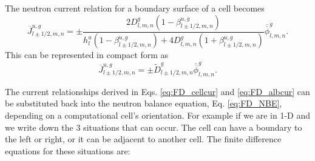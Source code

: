 \documentclass{ansconf}
\numberwithin{equation}{section}
\begin{document}
The neutron current relation for a boundary surface of a cell becomes
\begin{equation}
    \overline{J}^{u,g}_{l\pm1/2,m,n} = \pm \frac{2D_{l,m,n}^{g} \left(1-\beta_{l\pm1/2,m,n}^{u,g}\right)}{h_{l}^{u} \left(1-\beta_{l\pm1/2,m,n}^{u,g}\right) + 4D_{l,m,n}^{g} \left(1+\beta_{l\pm1/2,m,n}^{u,g}\right)}
    \overline{\overline{\phi}}_{l,m,n}^{g}.
\end{equation}
This can be represented in compact form as
\begin{equation}\label{eq:FD_albcur}
       \overline{J}^{u,g}_{l\pm1/2,m,n} = \pm \widetilde{D}_{l\pm1/2,m,n}^{g}
    \overline{\overline{\phi}}_{l,m,n}^{g}. 
\end{equation}

The current relationships derived in Eqs. \eqref{eq:FD_cellcur} and \eqref{eq:FD_albcur} can be substituted back into the neutron balance equation, Eq. \eqref{eq:FD_NBE}, depending on a computational cell's orientation.  For example if we are in 1-D and we write down the 3 situations that can occur. The cell can have a boundary to the left or right, or it can be adjacent to another cell. The finite difference equations for these situations are:
\end{document}
